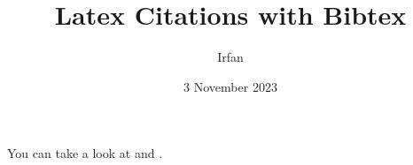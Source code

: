 \documentclass{article}
\title{Latex Citations with Bibtex }
\author{Irfan}
\date{3 November 2023}
\begin{document}
  \maketitle

  You can take a look at \cite{andersen} and \cite{shelly}.

  
  
\end{document}
